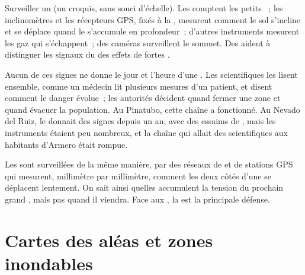 \begin{omfigure}
{\small Surveiller un  (un croquis, sans souci d'échelle). Les
 comptent les petits ~; les inclinomètres et les
récepteurs GPS, fixés à la , mesurent comment le sol s'incline et se
déplace quand le  s'accumule en profondeur~; d'autres instruments
mesurent les gaz qui s'échappent~; des caméras surveillent le sommet. Des
 aident à distinguer les signaux du  des effets de
fortes .}
\label{fig:g9:natural-risks:monitoring}
\end{omfigure}

Aucun de ces signes ne donne le jour et l'heure d'une . Les
scientifiques les lisent ensemble, comme un médecin lit plusieurs mesures
d'un patient, et disent comment le danger évolue~; les autorités décident
quand fermer une zone et quand évacuer la population. Au Pinatubo, cette
chaîne a fonctionné. Au Nevado del Ruiz, le  donnait des signes
depuis un an, avec des essaims de , mais les instruments étaient
peu nombreux, et la chaîne qui allait des scientifiques aux habitants
d'Armero était rompue.

Les  sont surveillées de la même manière, par des réseaux de
 et de stations GPS qui mesurent, millimètre par millimètre,
comment les deux côtés d'une  se déplacent lentement. On sait ainsi
quelles  accumulent la tension du prochain grand , mais pas
quand il viendra. Face aux , la  est la principale
défense.

\section{Cartes des aléas et zones inondables}

